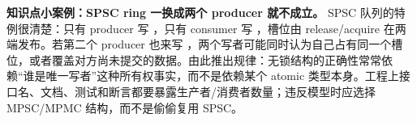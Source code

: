 \begin{casebox}
\textbf{知识点小案例：SPSC ring 一换成两个 producer 就不成立。}
SPSC 队列的特例很清楚：只有 producer 写 ，只有 consumer 写 ，槽位由 release/acquire 在两端发布。若第二个 producer 也来写 ，两个写者可能同时认为自己占有同一个槽位，或者覆盖对方尚未提交的数据。由此推出规律：无锁结构的正确性常常依赖“谁是唯一写者”这种所有权事实，而不是依赖某个 atomic 类型本身。工程上接口名、文档、测试和断言都要暴露生产者/消费者数量；违反模型时应选择 MPSC/MPMC 结构，而不是偷偷复用 SPSC。
\end{casebox}
